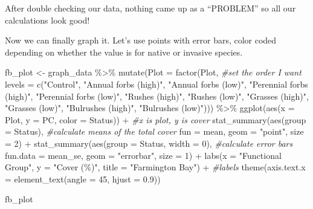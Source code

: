 \documentclass[
]{book}
\newenvironment{Shaded}{\begin{snugshade}}{\end{snugshade}}
\newcommand{\AttributeTok}[1]{\textcolor[rgb]{0.77,0.63,0.00}{#1}}
\newcommand{\CommentTok}[1]{\textcolor[rgb]{0.56,0.35,0.01}{\textit{#1}}}
\newcommand{\DecValTok}[1]{\textcolor[rgb]{0.00,0.00,0.81}{#1}}
\newcommand{\FloatTok}[1]{\textcolor[rgb]{0.00,0.00,0.81}{#1}}
\newcommand{\FunctionTok}[1]{\textcolor[rgb]{0.00,0.00,0.00}{#1}}
\newcommand{\NormalTok}[1]{#1}
\newcommand{\OtherTok}[1]{\textcolor[rgb]{0.56,0.35,0.01}{#1}}
\newcommand{\SpecialCharTok}[1]{\textcolor[rgb]{0.00,0.00,0.00}{#1}}
\newcommand{\StringTok}[1]{\textcolor[rgb]{0.31,0.60,0.02}{#1}}
\begin{document}
After double checking our data, nothing came up as a ``PROBLEM'' so all our calculations look good!

Now we can finally graph it. Let's use points with error bars, color coded depending on whether the value is for native or invasive species.

\begin{Shaded}
\begin{Highlighting}[]
\NormalTok{fb\_plot }\OtherTok{\textless{}{-}}\NormalTok{ graph\_data }\SpecialCharTok{\%\textgreater{}\%}
  \FunctionTok{mutate}\NormalTok{(}\AttributeTok{Plot =} \FunctionTok{factor}\NormalTok{(Plot, }\CommentTok{\#set the order I want}
                       \AttributeTok{levels =} \FunctionTok{c}\NormalTok{(}\StringTok{"Control"}\NormalTok{, }\StringTok{"Annual forbs (high)"}\NormalTok{, }
                                  \StringTok{"Annual forbs (low)"}\NormalTok{, }\StringTok{"Perennial forbs (high)"}\NormalTok{,}
                                  \StringTok{"Perennial forbs (low)"}\NormalTok{, }\StringTok{"Rushes (high)"}\NormalTok{,}
                                  \StringTok{"Rushes (low)"}\NormalTok{, }\StringTok{"Grasses (high)"}\NormalTok{, }
                                  \StringTok{"Grasses (low)"}\NormalTok{, }\StringTok{"Bulrushes (high)"}\NormalTok{,}
                                  \StringTok{"Bulrushes (low)"}\NormalTok{))) }\SpecialCharTok{\%\textgreater{}\%} 
  \FunctionTok{ggplot}\NormalTok{(}\FunctionTok{aes}\NormalTok{(}\AttributeTok{x =}\NormalTok{ Plot, }\AttributeTok{y =}\NormalTok{ PC, }\AttributeTok{color =}\NormalTok{ Status)) }\SpecialCharTok{+} \CommentTok{\#x is plot, y is cover}
  \FunctionTok{stat\_summary}\NormalTok{(}\FunctionTok{aes}\NormalTok{(}\AttributeTok{group =}\NormalTok{ Status), }\CommentTok{\#calculate means of the total cover}
               \AttributeTok{fun =}\NormalTok{ mean, }\AttributeTok{geom =} \StringTok{"point"}\NormalTok{, }\AttributeTok{size =} \DecValTok{2}\NormalTok{) }\SpecialCharTok{+}
  \FunctionTok{stat\_summary}\NormalTok{(}\FunctionTok{aes}\NormalTok{(}\AttributeTok{group =}\NormalTok{ Status, }\AttributeTok{width =} \DecValTok{0}\NormalTok{), }\CommentTok{\#calculate error bars}
               \AttributeTok{fun.data =}\NormalTok{ mean\_se, }\AttributeTok{geom =} \StringTok{"errorbar"}\NormalTok{, }\AttributeTok{size =} \DecValTok{1}\NormalTok{) }\SpecialCharTok{+}
  \FunctionTok{labs}\NormalTok{(}\AttributeTok{x =} \StringTok{"Functional Group"}\NormalTok{, }\AttributeTok{y =} \StringTok{"Cover (\%)"}\NormalTok{, }\AttributeTok{title =} \StringTok{"Farmington Bay"}\NormalTok{) }\SpecialCharTok{+} \CommentTok{\#labels}
  \FunctionTok{theme}\NormalTok{(}\AttributeTok{axis.text.x =} \FunctionTok{element\_text}\NormalTok{(}\AttributeTok{angle =} \DecValTok{45}\NormalTok{, }\AttributeTok{hjust =} \FloatTok{0.9}\NormalTok{)) }

\NormalTok{fb\_plot}
\end{Highlighting}
\end{Shaded}
\end{document}
